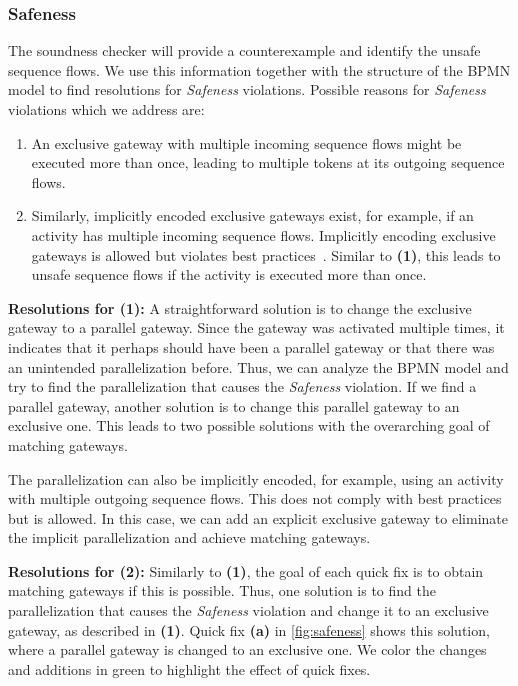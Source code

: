 \documentclass[runningheads]{llncs}
\begin{document}
\vspace{-1em}
\subsubsection{Safeness}
The soundness checker will provide a counterexample and identify the unsafe sequence flows.
We use this information together with the structure of the BPMN model to find resolutions for \textit{Safeness} violations.
Possible reasons for \textit{Safeness} violations which we address are:

\begin{enumerate}
	\item An exclusive gateway with multiple incoming sequence flows might be executed more than once, leading to multiple tokens at its outgoing sequence flows.
	\item Similarly, implicitly encoded exclusive gateways exist, for example, if an activity has multiple incoming sequence flows.
	Implicitly encoding exclusive gateways is allowed but violates best practices~\cite{camundaservicesgmbhBpmnlint2024}.
	Similar to \textbf{(1)}, this leads to unsafe sequence flows if the activity is executed more than once.
\end{enumerate}


\textbf{Resolutions for (1):} A straightforward solution is to change the exclusive gateway to a parallel gateway.
Since the gateway was activated multiple times, it indicates that it perhaps should have been a parallel gateway or that there was an unintended parallelization before.
Thus, we can analyze the BPMN model and try to find the parallelization that causes the \textit{Safeness} violation.
If we find a parallel gateway, another solution is to change this parallel gateway to an exclusive one.
This leads to two possible solutions with the overarching goal of matching gateways.

The parallelization can also be implicitly encoded, for example, using an activity with multiple outgoing sequence flows.
This does not comply with best practices~\cite{camundaservicesgmbhBpmnlint2024} but is allowed.
In this case, we can add an explicit exclusive gateway to eliminate the implicit parallelization and achieve matching gateways.

\textbf{Resolutions for (2):} Similarly to \textbf{(1)}, the goal of each quick fix is to obtain matching gateways if this is possible.
Thus, one solution is to find the parallelization that causes the \textit{Safeness} violation and change it to an exclusive gateway, as described in \textbf{(1)}.
Quick fix \textbf{(a)} in \autoref{fig:safeness} shows this solution, where a parallel gateway is changed to an exclusive one.
We color the changes and additions in green to highlight the effect of quick fixes.
\end{document}
